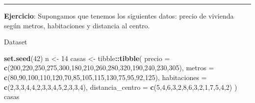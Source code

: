 \documentclass[
]{book}
\newenvironment{Shaded}{\begin{snugshade}}{\end{snugshade}}
\newcommand{\AttributeTok}[1]{\textcolor[rgb]{0.13,0.29,0.53}{#1}}
\newcommand{\DecValTok}[1]{\textcolor[rgb]{0.00,0.00,0.81}{#1}}
\newcommand{\FunctionTok}[1]{\textcolor[rgb]{0.13,0.29,0.53}{\textbf{#1}}}
\newcommand{\NormalTok}[1]{#1}
\newcommand{\OtherTok}[1]{\textcolor[rgb]{0.56,0.35,0.01}{#1}}
\newcommand{\SpecialCharTok}[1]{\textcolor[rgb]{0.81,0.36,0.00}{\textbf{#1}}}
\begin{document}
\begin{center}\rule{0.5\linewidth}{0.5pt}\end{center}

\textbf{Ejercicio}: Supongamos que tenemos los siguientes datos: precio de vivienda según metros, habitaciones y distancia al centro.

Dataset

\begin{Shaded}
\begin{Highlighting}[]
\FunctionTok{set.seed}\NormalTok{(}\DecValTok{42}\NormalTok{)}
\NormalTok{n }\OtherTok{\textless{}{-}} \DecValTok{14}
\NormalTok{casas }\OtherTok{\textless{}{-}}\NormalTok{ tibble}\SpecialCharTok{::}\FunctionTok{tibble}\NormalTok{(}
  \AttributeTok{precio =} \FunctionTok{c}\NormalTok{(}\DecValTok{200}\NormalTok{,}\DecValTok{220}\NormalTok{,}\DecValTok{250}\NormalTok{,}\DecValTok{275}\NormalTok{,}\DecValTok{300}\NormalTok{,}\DecValTok{180}\NormalTok{,}\DecValTok{210}\NormalTok{,}\DecValTok{260}\NormalTok{,}\DecValTok{280}\NormalTok{,}\DecValTok{320}\NormalTok{,}\DecValTok{190}\NormalTok{,}\DecValTok{240}\NormalTok{,}\DecValTok{230}\NormalTok{,}\DecValTok{305}\NormalTok{),}
  \AttributeTok{metros =} \FunctionTok{c}\NormalTok{(}\DecValTok{80}\NormalTok{,}\DecValTok{90}\NormalTok{,}\DecValTok{100}\NormalTok{,}\DecValTok{110}\NormalTok{,}\DecValTok{120}\NormalTok{,}\DecValTok{70}\NormalTok{,}\DecValTok{85}\NormalTok{,}\DecValTok{105}\NormalTok{,}\DecValTok{115}\NormalTok{,}\DecValTok{130}\NormalTok{,}\DecValTok{75}\NormalTok{,}\DecValTok{95}\NormalTok{,}\DecValTok{92}\NormalTok{,}\DecValTok{125}\NormalTok{),}
  \AttributeTok{habitaciones =} \FunctionTok{c}\NormalTok{(}\DecValTok{2}\NormalTok{,}\DecValTok{3}\NormalTok{,}\DecValTok{3}\NormalTok{,}\DecValTok{4}\NormalTok{,}\DecValTok{4}\NormalTok{,}\DecValTok{2}\NormalTok{,}\DecValTok{3}\NormalTok{,}\DecValTok{3}\NormalTok{,}\DecValTok{4}\NormalTok{,}\DecValTok{5}\NormalTok{,}\DecValTok{2}\NormalTok{,}\DecValTok{3}\NormalTok{,}\DecValTok{3}\NormalTok{,}\DecValTok{4}\NormalTok{),}
  \AttributeTok{distancia\_centro =} \FunctionTok{c}\NormalTok{(}\DecValTok{5}\NormalTok{,}\DecValTok{4}\NormalTok{,}\DecValTok{6}\NormalTok{,}\DecValTok{3}\NormalTok{,}\DecValTok{2}\NormalTok{,}\DecValTok{8}\NormalTok{,}\DecValTok{6}\NormalTok{,}\DecValTok{3}\NormalTok{,}\DecValTok{2}\NormalTok{,}\DecValTok{1}\NormalTok{,}\DecValTok{7}\NormalTok{,}\DecValTok{5}\NormalTok{,}\DecValTok{4}\NormalTok{,}\DecValTok{2}\NormalTok{)}
\NormalTok{)}
\NormalTok{casas}
\end{Highlighting}
\end{Shaded}
\end{document}
